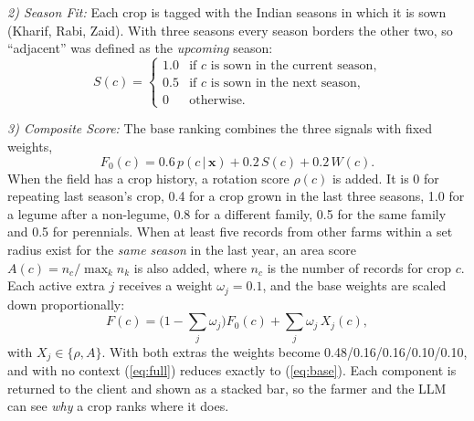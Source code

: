 \documentclass[conference]{IEEEtran}
\begin{document}
\textit{2) Season Fit:} Each crop is tagged with the Indian seasons in which it is sown (Kharif, Rabi, Zaid). With three seasons every season borders the other two, so ``adjacent'' was defined as the \emph{upcoming} season:
\begin{equation}
S(c) = \begin{cases} 1.0 & \text{if $c$ is sown in the current season,}\\ 0.5 & \text{if $c$ is sown in the next season,}\\ 0 & \text{otherwise.}\end{cases}
\label{eq:season}
\end{equation}

\textit{3) Composite Score:} The base ranking combines the three signals with fixed weights,
\begin{equation}
F_0(c) = 0.6\,p(c\,|\,\mathbf{x}) + 0.2\,S(c) + 0.2\,W(c).
\label{eq:base}
\end{equation}
When the field has a crop history, a rotation score $\rho(c)$ is added. It is 0 for repeating last season's crop, 0.4 for a crop grown in the last three seasons, 1.0 for a legume after a non-legume, 0.8 for a different family, 0.5 for the same family and 0.5 for perennials. When at least five records from other farms within a set radius exist for the \emph{same season} in the last year, an area score $A(c) = n_c / \max_k n_k$ is also added, where $n_c$ is the number of records for crop $c$. Each active extra $j$ receives a weight $\omega_j = 0.1$, and the base weights are scaled down proportionally:
\begin{equation}
F(c) = \Big(1 - \sum_{j} \omega_j\Big) F_0(c) + \sum_{j} \omega_j\, X_j(c),
\label{eq:full}
\end{equation}
with $X_j \in \{\rho, A\}$. With both extras the weights become 0.48/0.16/0.16/0.10/0.10, and with no context (\ref{eq:full}) reduces exactly to (\ref{eq:base}). Each component is returned to the client and shown as a stacked bar, so the farmer and the LLM can see \emph{why} a crop ranks where it does.
\end{document}
